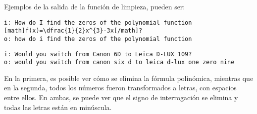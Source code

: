 \bigskip Ejemplos de la salida de la función de limpieza, pueden ser:

\begin{verbatim}
i: How do I find the zeros of the polynomial function [math]f(x)=\dfrac{1}{2}x^{3}-3x[/math]?
o: how do i find the zeros of the polynomial function
\end{verbatim}

\begin{verbatim}
i: Would you switch from Canon 6D to Leica D-LUX 109?
o: would you switch from canon six d to leica d-lux one zero nine
\end{verbatim}

En la primera, es posible ver cómo se elimina la fórmula polinómica, mientras que en la segunda, todos los números fueron transformados a letras, con espacios entre ellos. En ambas, se puede ver que el signo de interrogación se elimina y todas las letras están en minúscula.
